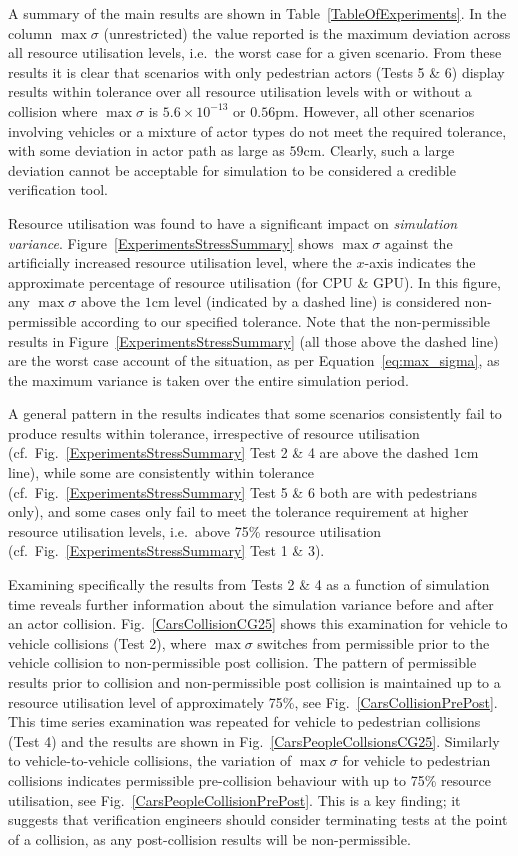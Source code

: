 A summary of the main results are shown in Table~\ref{TableOfExperiments}.  In the column $\max\sigma$ (unrestricted) the value reported is the maximum deviation across all resource utilisation levels, i.e.\ the worst case for a given scenario. From these results it is clear that scenarios with only pedestrian actors (Tests 5 \& 6) display results within tolerance over all resource utilisation levels with or without a collision where $\max\sigma$ is $5.6\times10^{-13}$ or $0.56\si{\pico\metre}$. However, all other scenarios involving vehicles or a mixture of actor types do not meet the required tolerance, with some deviation in actor path as large as $59$cm. Clearly, such a large deviation cannot be acceptable for simulation to be considered a credible verification tool.

Resource utilisation was found to have a significant impact on \textit{simulation variance}. Figure~\ref{ExperimentsStressSummary} shows $\max\sigma$ against the artificially increased resource utilisation level, where the $x$-axis indicates the approximate percentage of resource utilisation (for CPU \& GPU). In this figure, any $\max\sigma$ above the $1$cm level (indicated by a dashed line) is considered non-permissible according to our specified tolerance. Note that the non-permissible results in Figure~\ref{ExperimentsStressSummary} (all those above the dashed line) are the worst case account of the situation, as per Equation~\ref{eq:max_sigma}, as the maximum variance is taken over the entire simulation period.

A general pattern in the results indicates that some scenarios consistently fail to produce results within tolerance, irrespective of resource utilisation (cf.\ Fig.~\ref{ExperimentsStressSummary} Test 2 \& 4 are above the dashed $1$cm line), while some are consistently within tolerance (cf.\ Fig.~\ref{ExperimentsStressSummary} Test 5 \& 6 both are with pedestrians only), and some cases only fail to meet the tolerance requirement at higher resource utilisation levels, i.e.\ above 75\% resource utilisation (cf.\ Fig.~\ref{ExperimentsStressSummary} Test 1 \& 3). 

Examining specifically the results from Tests 2 \& 4 as a function of simulation time reveals further information about the simulation variance before and after an actor collision. Fig.~\ref{CarsCollisionCG25} shows this examination for vehicle to vehicle collisions (Test 2), where $\max\sigma$ switches from permissible prior to the vehicle collision to non-permissible post collision. 
%
The pattern of permissible results prior to collision and non-permissible post collision is maintained up to a resource utilisation level of approximately 75\%, see Fig.~\ref{CarsCollisionPrePost}. This time series examination was repeated for vehicle to pedestrian collisions (Test 4) and the results are shown in Fig.~\ref{CarsPeopleCollsionsCG25}. Similarly to vehicle-to-vehicle collisions, the variation of $\max\sigma$ for vehicle to pedestrian collisions indicates permissible pre-collision behaviour with up to 75\% resource utilisation, see Fig.~\ref{CarsPeopleCollisionPrePost}. This is a key finding; it suggests that verification engineers should consider terminating tests at the point of a collision, as any post-collision results will be non-permissible.

